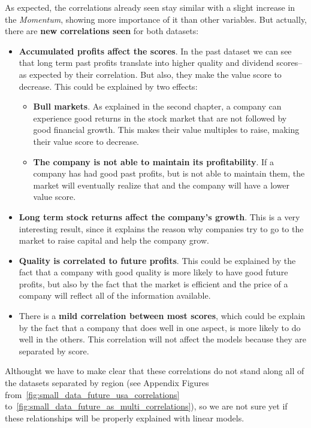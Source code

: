 \documentclass[11pt,english,a4paper,hidelinks]{book}
\begin{document}
\noindent As expected, the correlations already seen stay similar with a slight increase in the \textit{Momentum}, showing more importance of it than other variables. But actually, there are \textbf{new correlations seen} for both datasets:

\begin{itemize}
    \item  \textbf{Accumulated profits affect the scores}. In the past dataset we can see that long term past profits translate into higher quality and dividend scores-- as expected by their correlation. But also, they make the value score to decrease. This could be explained by two effects:
    \begin{itemize}
        \item \textbf{Bull markets}. As explained in the second chapter, a company can experience good returns in the stock market that are not followed by good financial growth. This makes their value multiples to raise, making their value score to decrease.
        \item \textbf{The company is not able to maintain its profitability}. If a company has had good past profits, but is not able to maintain them, the market will eventually realize that and the company will have a lower value score.
    \end{itemize}
    \item \textbf{Long term stock returns affect the company's growth}. This is a very interesting result, since it explains the reason why companies try to go to the market to raise capital and help the company grow.
    \item \textbf{Quality is correlated to future profits}. This could be explained by the fact that a company with good quality is more likely to have good future profits, but also by the fact that the market is efficient and the price of a company will reflect all of the information available.
    \item There is a \textbf{mild correlation between most scores}, which could be explain by the fact that a company that does well in one aspect, is more likely to do well in the others. This correlation will not affect the models because they are separated by score.
\end{itemize}

\noindent Althought we have to make clear that these correlations do not stand along all of the datasets separated by region (see Appendix Figures from~\ref{fig:small_data_future_usa_correlations} to~\ref{fig:small_data_future_as_multi_correlations}), so we are not sure yet if these relationships will be properly explained with linear models.
\end{document}

